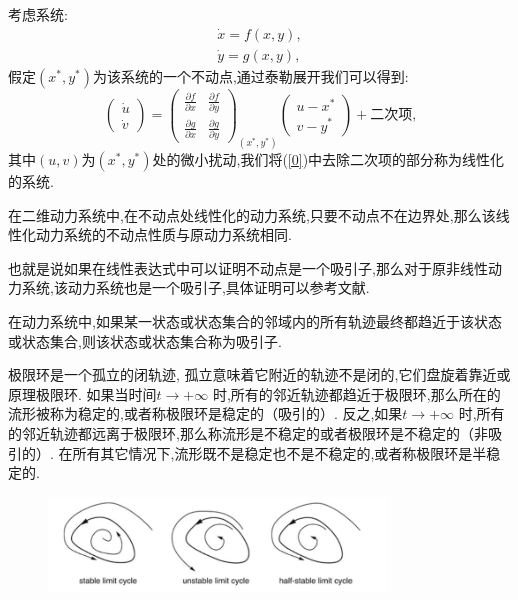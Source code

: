 考虑系统:
\begin{equation}
    \begin{aligned}
        \dot{x}=f(x,y), \\
        \dot{y}=g(x,y),
    \end{aligned}
\end{equation}
假定$(x^*,y^*)$为该系统的一个不动点,通过泰勒展开我们可以得到:
\begin{equation}\label{0}
    \begin{pmatrix}
        \dot{u} \\
        \dot{v}
    \end{pmatrix}=
    \begin{pmatrix}
        \frac{\partial f}{\partial x} & \frac{\partial f}{\partial y} \\
        \frac{\partial g}{\partial x} & \frac{\partial g}{\partial y}
    \end{pmatrix}_{(x^*,y^*)}\begin{pmatrix}
        u-x^* \\ v-y^*
    \end{pmatrix}+\text{二次项,}
\end{equation}
其中$(u,v)$为$(x^*,y^*)$处的微小扰动,我们将(\ref{0})中去除二次项的部分称为线性化的系统. 
\begin{prop}
    在二维动力系统中,在不动点处线性化的动力系统,只要不动点不在边界处,那么该线性化动力系统的不动点性质与原动力系统相同. 
\end{prop}

也就是说如果在线性表达式中可以证明不动点是一个吸引子,那么对于原非线性动力系统,该动力系统也是一个吸引子,具体证明可以参考文献\cite{andronov1974qualitative}. 
\begin{defn}[吸引子]
    在动力系统中,如果某一状态或状态集合的邻域内的所有轨迹最终都趋近于该状态或状态集合,则该状态或状态集合称为吸引子. 
\end{defn}

\begin{defn}[极限环]
    极限环是一个孤立的闭轨迹, 孤立意味着它附近的轨迹不是闭的,它们盘旋着靠近或原理极限环. 如果当时间$t\to +\infty$ 时,所有的邻近轨迹都趋近于极限环,那么所在的流形被称为稳定的,或者称极限环是稳定的（吸引的）. 反之,如果$t\to +\infty$ 时,所有的邻近轨迹都远离于极限环,那么称流形是不稳定的或者极限环是不稳定的（非吸引的）. 在所有其它情况下,流形既不是稳定也不是不稳定的,或者称极限环是半稳定的. 
\end{defn}
\begin{figure}[H]
    \centering
    \includegraphics[width=0.8\textwidth]{Img/limit_cycle.png}
    \label{fig:limit_cycle}
\end{figure}

